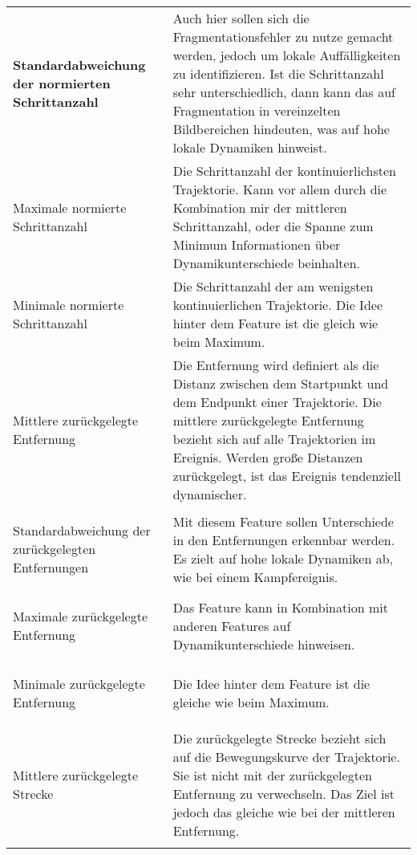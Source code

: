 \begin{longtable}{>{\bfseries}p{} p{}}
Standardabweichung der normierten Schrittanzahl &  Auch hier sollen sich die Fragmentationsfehler zu nutze gemacht werden, jedoch um lokale Auffälligkeiten zu identifizieren. Ist die Schrittanzahl sehr unterschiedlich, dann kann das auf Fragmentation in vereinzelten Bildbereichen hindeuten, was auf hohe lokale Dynamiken hinweist. \\
\addlinespace[0.7em] %

Maximale normierte Schrittanzahl & Die Schrittanzahl der kontinuierlichsten Trajektorie. Kann vor allem durch die Kombination mir der mittleren Schrittanzahl, oder die Spanne zum Minimum Informationen über Dynamikunterschiede beinhalten. \\
\addlinespace[0.7em] %

Minimale normierte Schrittanzahl &  Die Schrittanzahl der am wenigsten kontinuierlichen Trajektorie. Die Idee hinter dem Feature ist die gleich wie beim Maximum. \\
\addlinespace[0.7em] %

Mittlere zurückgelegte Entfernung & Die Entfernung wird definiert als die Distanz zwischen dem Startpunkt und dem Endpunkt einer Trajektorie. Die mittlere zurückgelegte Entfernung bezieht sich auf alle Trajektorien im Ereignis. Werden große Distanzen zurückgelegt, ist das Ereignis tendenziell dynamischer. \\
\addlinespace[0.7em] %

Standardabweichung der zurückgelegten Entfernungen & Mit diesem Feature sollen Unterschiede in den Entfernungen erkennbar werden. Es zielt auf hohe lokale Dynamiken ab, wie bei einem Kampfereignis. \\
\addlinespace[0.7em] %

Maximale zurückgelegte Entfernung & Das Feature kann in Kombination mit anderen Features auf Dynamikunterschiede hinweisen.  \\
\addlinespace[0.7em] %

Minimale zurückgelegte Entfernung & Die Idee hinter dem Feature ist die gleiche wie beim Maximum. \\
\addlinespace[0.7em] %

Mittlere zurückgelegte Strecke & Die zurückgelegte Strecke bezieht sich auf die Bewegungskurve der Trajektorie. Sie ist nicht mit der zurückgelegten Entfernung zu verwechseln. Das Ziel ist jedoch das gleiche wie bei der mittleren Entfernung.\\
\addlinespace[0.7em] %


\end{longtable}
